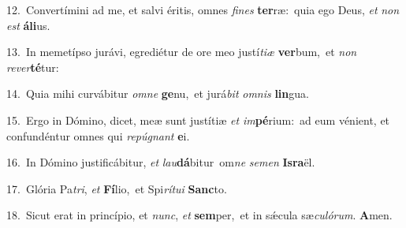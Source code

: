 {\numbfont\textcolor{\numbcolor}{12.}}~Convertímini ad me, et salvi éritis, omnes \textit{fi}\-\textit{nes} \textbf{ter}\-ræ:~\star quia ego Deus, \textit{et} \textit{non} \textit{est} \textbf{á}\-\textbf{li}us.\par
{\numbfont\textcolor{\numbcolor}{13.}}~In memetípso jurávi, egrediétur de ore meo justí\-\textit{ti}\-\textit{æ} \textbf{ver}\-bum,~\star et \textit{non} \textit{re}\-\textit{ver}\textbf{té}tur:\par
{\numbfont\textcolor{\numbcolor}{14.}}~Quia mihi curvábitur \textit{om}\-\textit{ne} \textbf{ge}\-nu,~\star et jurá\textit{bit} \textit{om}\-\textit{nis} \textbf{lin}\-gua.\par
{\numbfont\textcolor{\numbcolor}{15.}}~Ergo in Dómino, dicet, meæ sunt justítiæ \textit{et} \textit{im}\-\textbf{pé}rium:~\star ad eum vénient, et confundéntur omnes qui \textit{re}\-\textit{pú}\textit{gnant} \textbf{e}\-i.\par
{\numbfont\textcolor{\numbcolor}{16.}}~In Dómino justificábitur, \textit{et} \textit{lau}\-\textbf{dá}bitur~\star om\textit{ne} \textit{se}\-\textit{men} \textbf{Is}\-\textbf{ra}ël.\par
{\numbfont\textcolor{\numbcolor}{17.}}~Glória Pa\-\textit{tri}\-, \textit{et} \textbf{Fí}\-lio,~\star et Spi\-\textit{rí}\-\textit{tu}\textit{i} \textbf{Sanc}\-to.\par
{\numbfont\textcolor{\numbcolor}{18.}}~Sicut erat in princípio, et \textit{nunc}\-, \textit{et} \textbf{sem}\-per,~\star et in sǽcula sæ\-\textit{cu}\-\textit{ló}\textit{rum}. \textbf{A}\-men.\par
